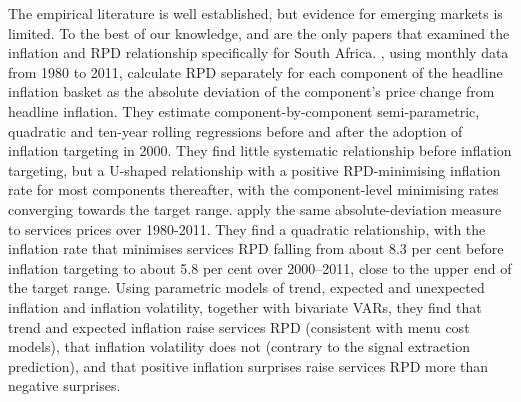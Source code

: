\documentclass[
  letterpaper,
  DIV=11,
  numbers=noendperiod]{scrartcl}
\begin{document}
The empirical literature is well established, but evidence for emerging
markets is limited. To the best of our knowledge, \citet{ndou2014} and
\citet{ndou2017} are the only papers that examined the inflation and RPD
relationship specifically for South Africa. \citet{ndou2014}, using
monthly data from 1980 to 2011, calculate RPD separately for each
component of the headline inflation basket as the absolute deviation of
the component's price change from headline inflation. They estimate
component-by-component semi-parametric, quadratic and ten-year rolling
regressions before and after the adoption of inflation targeting in
2000. They find little systematic relationship before inflation
targeting, but a U-shaped relationship with a positive RPD-minimising
inflation rate for most components thereafter, with the component-level
minimising rates converging towards the target range. \citet{ndou2017}
apply the same absolute-deviation measure to services prices over
1980-2011. They find a quadratic relationship, with the inflation rate
that minimises services RPD falling from about 8.3 per cent before
inflation targeting to about 5.8 per cent over 2000--2011, close to the
upper end of the target range. Using parametric models of trend,
expected and unexpected inflation and inflation volatility, together
with bivariate VARs, they find that trend and expected inflation raise
services RPD (consistent with menu cost models), that inflation
volatility does not (contrary to the signal extraction prediction), and
that positive inflation surprises raise services RPD more than negative
surprises.
\end{document}
